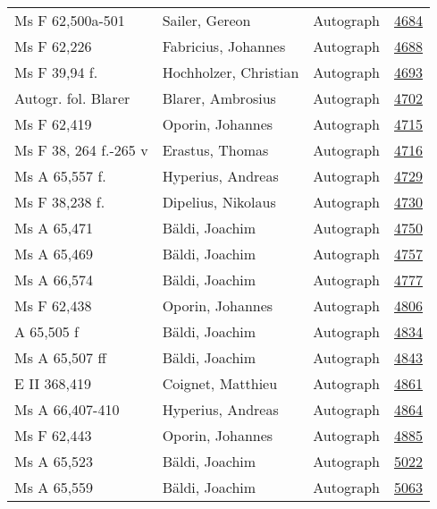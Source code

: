 \documentclass[10pt,a4paper,landscape]{report}
\begin{document}
\begin{longtable}{p{16cm}p{4cm}lr}
Ms F 62,500a-501	&	Sailer, Gereon	&	Autograph	&	\href{http://130.60.24.72/assignment/4684}{4684}\\
Ms F 62,226	&	Fabricius, Johannes	&	Autograph	&	\href{http://130.60.24.72/assignment/4688}{4688}\\
Ms F 39,94 f.	&	Hochholzer, Christian	&	Autograph	&	\href{http://130.60.24.72/assignment/4693}{4693}\\
Autogr. fol. Blarer	&	Blarer, Ambrosius	&	Autograph	&	\href{http://130.60.24.72/assignment/4702}{4702}\\
Ms F 62,419	&	Oporin, Johannes	&	Autograph	&	\href{http://130.60.24.72/assignment/4715}{4715}\\
Ms F 38, 264 f.-265 v	&	Erastus, Thomas	&	Autograph	&	\href{http://130.60.24.72/assignment/4716}{4716}\\
Ms A 65,557 f.	&	Hyperius, Andreas	&	Autograph	&	\href{http://130.60.24.72/assignment/4729}{4729}\\
Ms F 38,238 f.	&	Dipelius, Nikolaus	&	Autograph	&	\href{http://130.60.24.72/assignment/4730}{4730}\\
Ms A 65,471	&	Bäldi, Joachim	&	Autograph	&	\href{http://130.60.24.72/assignment/4750}{4750}\\
Ms A 65,469	&	Bäldi, Joachim	&	Autograph	&	\href{http://130.60.24.72/assignment/4757}{4757}\\
Ms A 66,574	&	Bäldi, Joachim	&	Autograph	&	\href{http://130.60.24.72/assignment/4777}{4777}\\
Ms F 62,438	&	Oporin, Johannes	&	Autograph	&	\href{http://130.60.24.72/assignment/4806}{4806}\\
A 65,505 f	&	Bäldi, Joachim	&	Autograph	&	\href{http://130.60.24.72/assignment/4834}{4834}\\
Ms A 65,507 ff	&	Bäldi, Joachim	&	Autograph	&	\href{http://130.60.24.72/assignment/4843}{4843}\\
E II 368,419	&	Coignet, Matthieu	&	Autograph	&	\href{http://130.60.24.72/assignment/4861}{4861}\\
Ms A 66,407-410	&	Hyperius, Andreas	&	Autograph	&	\href{http://130.60.24.72/assignment/4864}{4864}\\
Ms F 62,443	&	Oporin, Johannes	&	Autograph	&	\href{http://130.60.24.72/assignment/4885}{4885}\\
Ms A 65,523	&	Bäldi, Joachim	&	Autograph	&	\href{http://130.60.24.72/assignment/5022}{5022}\\
Ms A 65,559	&	Bäldi, Joachim	&	Autograph	&	\href{http://130.60.24.72/assignment/5063}{5063}\\

\end{longtable}
\end{document}
